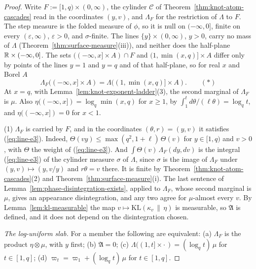 \begin{proof}
\leanok
{}
Write $F := [1,q) \times (0,\infty)$, the cylinder $\mathcal{C}$ of
Theorem~\ref{thm:knot-atom-cascades} read in the coordinates $(y, v)$, and $\Lambda_F$ for the
restriction of $\Lambda$ to $F$. The step measure is the folded \Levy{} measure of $\phi$, so it is
null on $(-\infty,0]$, finite on every $(\varepsilon,\infty)$, $\varepsilon > 0$, and
$\sigma$-finite. The lines $\{y\} \times (0,\infty)$, $y > 0$, carry no mass of $\Lambda$
(Theorem~\ref{thm:surface-measure}(iii)), and neither does the half-plane $\mathbb{R} \times (-\infty,0]$.
The sets $((-\infty,x] \times A) \cap F$ and $(1, \min(x,q)] \times A$ differ only by points of the
lines $y = 1$ and $y = q$ and of that half-plane, so for real $x$ and Borel $A$
\[
  \Lambda_F((-\infty,x] \times A) = \Lambda((1, \min(x,q)] \times A). \qquad (*)
\]
At $x = q$, with Lemma~\ref{lem:knot-exponent-ladder}(3), the second marginal of $\Lambda_F$ is
$\mu$. Also $\eta((-\infty,x]) = \log_q\min(x,q)$ for $x \ge 1$, by
$\int_1^td\theta/(\ell\theta) = \log_qt$, and $\eta((-\infty,x]) = 0$ for $x < 1$.

(1) $\Lambda_F$ is carried by $F$, and in the coordinates $(\theta, r) = (y, v)$ it satisfies
(\ref{eq:line-e3}). Indeed, $\Theta(vy) \le \max(q^2, 1 + \ell)\,\Theta(v)$ for $y \in [1,q)$ and
$v > 0$, with $\Theta$ the weight of (\ref{eq:line-e3}). And $\int\Theta(v)\,\Lambda_F(dy, dv)$ is
the integral (\ref{eq:line-e3}) of the cylinder measure $\sigma$ of $\Lambda$, since $\sigma$ is the
image of $\Lambda_F$ under $(y, v) \mapsto (y, v/y)$ and $r\theta = v$ there. It is finite by
Theorem~\ref{thm:knot-atom-cascades}(2) and Theorem~\ref{thm:surface-measure}(i). The last sentence
of Lemma~\ref{lem:phase-disintegration-exists}, applied to $\Lambda_F$, whose second marginal is
$\mu$, gives an appearance disintegration, and any two agree for $\mu$-almost every $v$. By
Lemma~\ref{lem:kl-measurable} the map $v \mapsto \mathrm{KL}(\kappa_v \,\|\, \eta)$ is measurable,
so $\mathfrak{A}$ is defined, and it does not depend on the disintegration chosen.

\emph{The log-uniform slab.} For a member the following are equivalent: (a) $\Lambda_F$ is the
product $\eta \otimes \mu$, with $y$ first; (b) $\mathfrak{A} = 0$; (c)
$\Lambda((1,t] \times \cdot\,) = (\log_qt)\,\mu$ for $t \in [1,q]$; (d)
$\varpi_t = \varpi_1 + (\log_qt)\,\mu$ for $t \in [1,q]$.


\end{proof}
